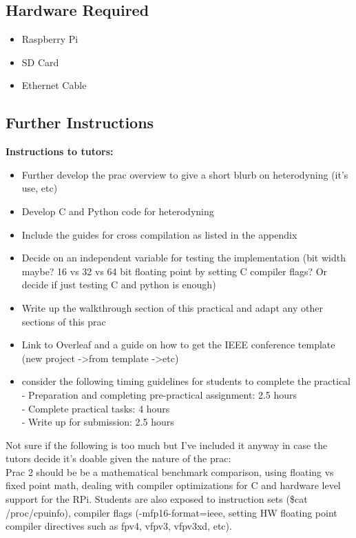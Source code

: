 \subsection{Hardware Required}
\begin{itemize}
    \item Raspberry Pi
    \item SD Card
    \item Ethernet Cable
\end{itemize}

\subsection{Further Instructions}
\textbf{Instructions to tutors:}
\begin{itemize}
    \item Further develop the prac overview to give a short blurb on heterodyning (it's use, etc)
    \item Develop C and Python code for heterodyning
    \item Include the guides for cross compilation as listed in the appendix
    \item Decide on an independent variable for testing the implementation (bit width maybe? 16 vs 32 vs 64 bit floating point by setting C compiler flags? Or decide if just testing C and python is enough)
    \item Write up the walkthrough section of this practical and adapt any other sections of this prac
    \item Link to Overleaf and a guide on how to get the IEEE conference template (new project -\textgreater  from template -\textgreater  etc)
    \item consider the following timing guidelines for students to complete the practical\\
                - Preparation and completing pre-practical assignment: 2.5 hours\\
                - Complete practical tasks: 4 hours\\
                - Write up for submission:  2.5 hours
\end{itemize}


Not sure if the following  is too much but I've included it anyway in case the tutors decide it's doable given the nature of the prac:\\
Prac 2 should be be a mathematical benchmark comparison, using floating vs fixed point math, dealing with compiler optimizations for C and hardware level support for the RPi. Students are also exposed to instruction sets (\$cat /proc/cpuinfo), compiler flags (-mfp16-format=ieee, setting HW floating point compiler directives such as fpv4, vfpv3, vfpv3xd, etc).

